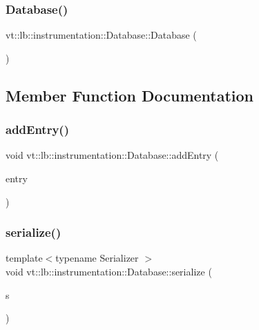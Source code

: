 \subsubsection{\texorpdfstring{Database()}{Database()}}
{\footnotesize\ttfamily vt\+::lb\+::instrumentation\+::\+Database\+::\+Database (\begin{DoxyParamCaption}{ }\end{DoxyParamCaption})\hspace{0.3cm}{\ttfamily [default]}}



\subsection{Member Function Documentation}
\mbox{\label{structvt_1_1lb_1_1instrumentation_1_1_database_ab9bf31b95d1c80bbe02268cd9689d453}} 
\subsubsection{\texorpdfstring{add\+Entry()}{addEntry()}}
{\footnotesize\ttfamily void vt\+::lb\+::instrumentation\+::\+Database\+::add\+Entry (\begin{DoxyParamCaption}\item[{\hyperlink{structvt_1_1lb_1_1instrumentation_1_1_database_ab04e7d7099af7dd33f4ac1594f8cde32}{Entry\+Type} \&\&}]{entry }\end{DoxyParamCaption})}

\mbox{\label{structvt_1_1lb_1_1instrumentation_1_1_database_a7e7970fb706eaf6b1f1123d5a79120d0}} 
\subsubsection{\texorpdfstring{serialize()}{serialize()}}
{\footnotesize\ttfamily template$<$typename Serializer $>$ \\
void vt\+::lb\+::instrumentation\+::\+Database\+::serialize (\begin{DoxyParamCaption}\item[{Serializer \&}]{s }\end{DoxyParamCaption})\hspace{0.3cm}{\ttfamily [inline]}}



